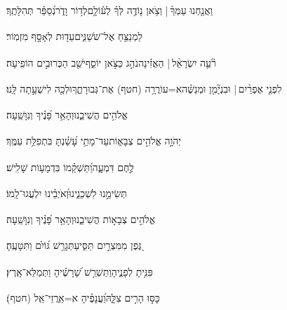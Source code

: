 \documentclass[12pt]{article}
\newcommand{\loc}[1]{\textsuperscript{\locf{#1}}}
\begin{document}
{\loc{ יג}~}‏וַאֲנַ֤חְנוּ עַמְּךָ֨ |  וְצֹ֥אן {\hfill}נ֤וֹדֶ֥ה לְּךָ֗ לְע֫וֹלָ֥ם\newline\hspace*{.5em}לְד֥וֹר וָדֹ֑ר{\hfill}נְ֝סַפֵּ֗ר תְּהִלָּתֶֽךָ׃\par\pend
\ledpb
\pstart[\subsection*{\textcolor{red}{פרק פ}}]\label{פרק פ}
{\loc{ א}~}‏לַמְנַצֵּ֥חַ אֶל־שֹׁשַׁנִּ֑ים{\hfill}עֵד֖וּת לְאָסָ֣ף מִזְמֽוֹר׃\par

{\loc{ ב}~}‏רֹ֘עֵ֤ה יִשְׂרָאֵ֨ל | {\hfill}הַאֲזִ֗ינָה\newline\hspace*{.5em}נֹהֵ֣ג כַּצֹּ֣אן יוֹסֵ֑ף{\hfill}יֹשֵׁ֖ב הַכְּרוּבִ֣ים הוֹפִֽיעָה׃\par

{\loc{ ג}~}‏לִפְנֵ֤י אֶפְרַ֨יִם | {\hfill}וּבִנְיָ֘מִ֤ן וּמְנַשֶּׁ֗ה\newline\hspace*{.5em}א=עוֹרֲרָ֥ה (חטף) אֶת־גְּבוּרָתֶ֑ךָ{\hfill}וּלְכָ֖ה לִישֻׁעָ֣תָה לָּֽנוּ׃\par

{\loc{ ד}~}‏אֱלֹהִ֥ים הֲשִׁיבֵ֑נוּ{\hfill}וְהָאֵ֥ר פָּ֝נֶ֗יךָ וְנִוָּשֵֽׁעָה׃\par

{\loc{ ה}~}‏יְהֹוָ֣ה אֱלֹהִ֣ים צְבָא֑וֹת{\hfill}עַד־מָתַ֥י עָ֝שַׁ֗נְתָּ בִּתְפִלַּ֥ת עַמֶּֽךָ׃\par

{\loc{ ו}~}‏ לֶ֣חֶם דִּמְעָ֑ה{\hfill}וַ֝תַּשְׁקֵ֗מוֹ בִּדְמָע֥וֹת שָׁלִֽישׁ׃\par

{\loc{ ז}~}‏תְּשִׂימֵ֣נוּ  לִשְׁכֵנֵ֑ינוּ{\hfill}וְ֝אֹיְבֵ֗ינוּ יִלְעֲגוּ־לָֽמוֹ׃\par

{\loc{ ח}~}‏אֱלֹהִ֣ים צְבָא֣וֹת הֲשִׁיבֵ֑נוּ{\hfill}וְהָאֵ֥ר פָּ֝נֶ֗יךָ וְנִוָּשֵֽׁעָה׃\par

{\loc{ ט}~}‏גֶּ֭פֶן מִמִּצְרַ֣יִם תַּסִּ֑יעַ{\hfill}תְּגָרֵ֥שׁ גּ֝וֹיִ֗ם וַתִּטָּעֶֽהָ׃\par

{\loc{ י}~}‏פִּנִּ֥יתָ לְפָנֶ֑יהָ{\hfill}וַתַּשְׁרֵ֥שׁ שָׁ֝רָשֶׁ֗יהָ וַתְּמַלֵּא־אָֽרֶץ׃\par

{\loc{ יא}~}‏כׇּסּ֣וּ הָרִ֣ים צִלָּ֑הּ{\hfill}וַ֝עֲנָפֶ֗יהָ א=אַֽרֲזֵי־אֵֽל (חטף)׃\par
\end{document}
